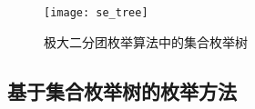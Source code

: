 
\begin{figure} [ht]
  \centering
  \vspace{0.3 in}
  \texttt{[image: se\_tree]}
  \vspace{0.2 in}
  \caption{极大二分团枚举算法中的集合枚举树}
  \label{fig:se}
\end{figure}

\subsection{基于集合枚举树的枚举方法}

